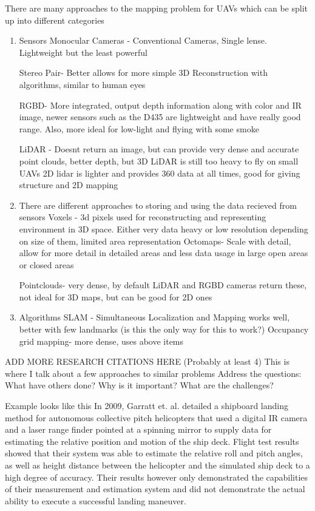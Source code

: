 \documentclass[12pt, letterpaper]{article}
\begin{document}
There are many approaches to the mapping problem for UAVs which can be split up into different categories
\begin{enumerate}
\item Sensors 
Monocular Cameras - Conventional Cameras, Single lense. Lightweight but the least powerful

Stereo Pair- Better allows for more simple 3D Reconstruction with algorithms, similar to human eyes

RGBD- More integrated, output depth information along with color and IR image, newer sensors such as the D435 are lightweight and have really good range. Also, more ideal for low-light and flying with some smoke

LiDAR - Doesnt return an image, but can provide very dense and accurate point clouds, better depth, but 3D LiDAR is still too heavy to fly on small UAVs 2D lidar is lighter and provides 360 data at all times, good for giving structure and 2D mapping
 
\item There are different approaches to storing and using the data recieved from  sensors
Voxels - 3d pixels used for reconstructing and representing environment in 3D space. Either very data heavy or low resolution depending on size of them, limited area representation
Octomaps- Scale with detail, allow for more detail in detailed areas and less data usage in large open areas or closed areas

Pointclouds- very dense, by default LiDAR and RGBD cameras return these, not ideal for 3D maps, but can be good for 2D ones

\item Algorithms
SLAM - Simultaneous Localization and Mapping works well, better with few landmarks (is this the only way for this to work?)
Occupancy grid mapping- more dense, uses above items

\end{enumerate}
ADD MORE RESEARCH CITATIONS HERE (Probably at least 4)
This is where I talk about a few approaches to similar problems
Address the questions: What have others done? Why is it important? What are the challenges?  

Example looks like this In 2009, Garratt et. al. \cite{Garratt2009} detailed a shipboard landing method for autonomous collective pitch helicopters that used a digital IR camera and a laser range finder pointed at a spinning mirror to supply data for estimating the relative position and motion of the ship deck.  Flight test results showed that their system was able to estimate the relative roll and pitch angles, as well as height distance between the helicopter and the simulated ship deck to a high degree of accuracy.  Their results however only demonstrated the capabilities of their measurement and estimation system and did not demonstrate the actual ability to execute a successful landing maneuver.  
\end{document}
